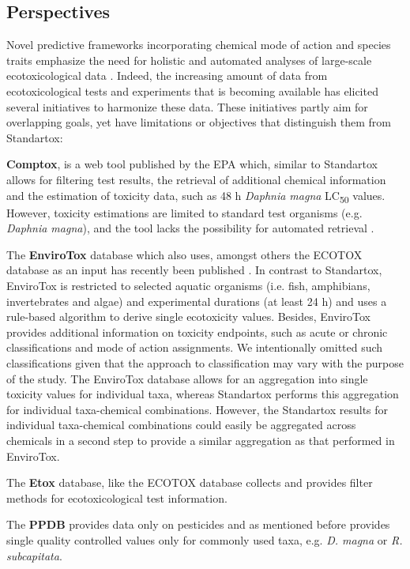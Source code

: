 \documentclass[journal,datadescriptor,accept,moreauthors,pdftex]{Definitions/mdpi}
\begin{document}
\subsection{Perspectives}
Novel predictive frameworks incorporating chemical mode of action and species traits emphasize the need for holistic and automated analyses of large-scale ecotoxicological data \citep{malaj_evolutionary_2016, vandenberg_modeling_2019}. Indeed, the increasing amount of data from ecotoxicological tests and experiments that is becoming available has elicited several initiatives to harmonize these data. These initiatives partly aim for overlapping goals, yet have limitations or objectives that distinguish them from Standartox:

\textbf{Comptox}, is a web tool published by the EPA which, similar to Standartox allows for filtering test results, the retrieval of additional chemical information and the estimation of toxicity data, such as 48 h \textit{Daphnia magna} LC\textsubscript{50} values. However, toxicity estimations are limited to standard test organisms (e.g. \textit{Daphnia magna}), and the tool lacks the possibility for automated retrieval \citep{williams_comptox_2017}.

The \textbf{EnviroTox} database which also uses, amongst others the ECOTOX database as an input has recently been published \citep{healthandenvironmentalsciencesinstitutehesi_envirotox_2019, connors_creation_2019}. In contrast to Standartox, EnviroTox  is restricted to selected aquatic organisms (i.e. fish, amphibians, invertebrates and algae) and experimental durations (at least 24 h) and uses a rule-based algorithm to derive single ecotoxicity values. Besides, EnviroTox provides additional information on toxicity endpoints, such as acute or chronic classifications and mode of action assignments. We intentionally omitted such classifications given that the approach to classification may vary with the purpose of the study. The EnviroTox database allows for an aggregation into single toxicity values for individual taxa, whereas Standartox performs this aggregation for individual taxa-chemical combinations. However, the Standartox results for individual taxa-chemical combinations could easily be aggregated across chemicals in a second step to provide a similar aggregation as that performed in EnviroTox.

The \textbf{Etox} database, like the ECOTOX database collects and provides filter methods for ecotoxicological test information.

The \textbf{PPDB} provides data only on pesticides and as mentioned before provides single quality controlled values only for commonly used taxa, e.g. \textit{D. magna} or \textit{R. subcapitata}.
\end{document}
